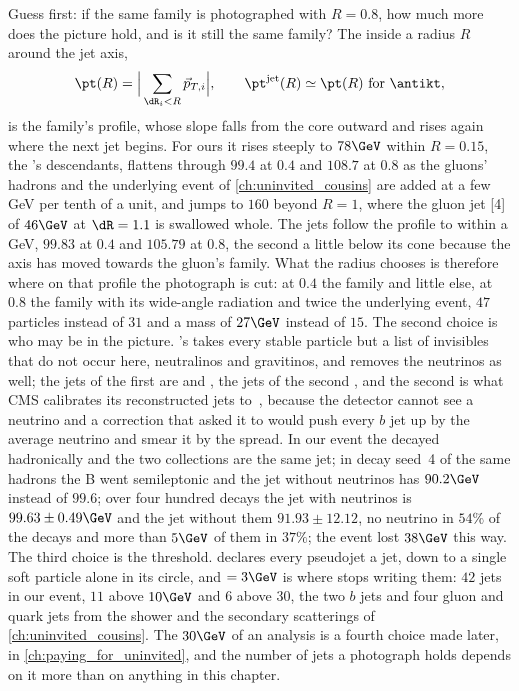 Guess first: if the same family is photographed with $R=0.8$, how much
more does the picture hold, and is it still the same family? The \pt
inside a radius $R$ around the jet axis,
\begin{equation}
  \pt(R)=\Big|\sum_{\dR_i<R}\vec p_{T,i}\Big|,\qquad
  \pt^{\mathrm{jet}}(R)\simeq\pt(R)\ \text{for \antikt},
  \label{eq:family_photograph:ptR}
\end{equation}
is the family's profile, whose slope falls from the core outward and
rises again where the next jet begins. For ours it rises steeply to $78\GeV$ within
$R=0.15$, the \Bbar's descendants, flattens through $99.4$ at $0.4$ and
$108.7$ at $0.8$ as the gluons' hadrons and the underlying event of
\cref{ch:uninvited_cousins} are added at a few GeV per tenth of a unit,
and jumps to $160$ beyond $R=1$, where the gluon jet [4] of $46\GeV$ at
$\dR=1.1$ is swallowed whole. The \antikt jets follow the profile to
within a GeV, $99.83$ at $0.4$ and $105.79$ at $0.8$, the second a little
below its cone because the \akeight axis has moved towards the gluon's
family. What the radius chooses is therefore where on that profile the
photograph is cut: at $0.4$ the family and little else, at $0.8$ the
family with its wide-angle radiation and twice the underlying event,
$47$ particles instead of $31$ and a mass of $27\GeV$ instead of $15$.
The second choice is who may be in the picture. \CMSSW's
 takes every stable particle but a list of
invisibles that do not occur here, neutralinos and gravitinos, and
 removes the neutrinos as well; the jets of
the first are \akfour and \akeight, the jets of the second \akfournonu,
and the second is what CMS calibrates its reconstructed jets
to~\cite{CMS:2016lmd}, because the detector cannot see a neutrino and a
correction that asked it to would push every $b$ jet up by the average
neutrino and smear it by the spread. In our event the \Bbar decayed
hadronically and the two \akfour collections are the same jet; in
decay seed~4 of the same hadrons the B went semileptonic and the jet
without neutrinos has $90.2\GeV$ instead of $99.6$; over four hundred
decays the jet with neutrinos is $99.63\pm0.49\GeV$ and the jet without
them $91.93\pm12.12$, no neutrino in $54\%$ of the decays and more than
$5\GeV$ of them in $37\%$; the \CMSSW event lost $38\GeV$ this way. The
third choice is the threshold. \antikt declares every pseudojet a jet,
down to a single soft particle alone in its circle, and
 $=3\GeV$ is where \CMSSW stops writing
them: $42$ \akfour jets in our event, $11$ above $10\GeV$ and $6$ above
$30$, the two $b$ jets and four gluon and quark jets from the shower and
the secondary scatterings of \cref{ch:uninvited_cousins}. The $30\GeV$
of an analysis is a fourth choice made later, in
\cref{ch:paying_for_uninvited}, and the number of jets a photograph holds
depends on it more than on anything in this chapter.

